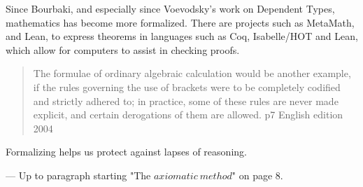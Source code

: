 \documentclass[]{scrartcl}
\begin{document}
Since Bourbaki, and especially since Voevodsky's work on Dependent Types, mathematics has become more formalized. There are projects such as MetaMath, and Lean, to express theorems in languages such as Coq, Isabelle/HOT and Lean, which allow for computers to assist in checking proofs.

\begin{quote}
	The formulae of ordinary algebraic calculation would be another example, if the rules governing the use of brackets were to be completely codified and strictly adhered to; in practice, some of these rules are never made explicit, and certain derogations of them are allowed. p7 English edition 2004
\end{quote}

Formalizing helps us protect against lapses of reasoning.

---
Up to paragraph starting "The $axiomatic\ method$" on page 8.
\end{document}
